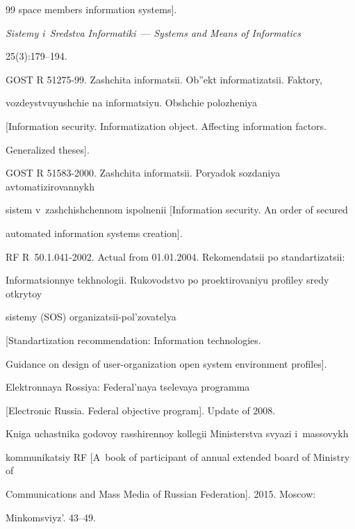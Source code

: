 {{\begin{thebibliography}{99}
space members information systems]. 

\textit{Sistemy i~Sredstva Informatiki}~--- \textit{Systems and Means of Informatics} 

25(3):179--194.




GOST R 51275-99. Zashchita informatsii. Ob''ekt informatizatsii. Faktory, 

vozdeystvuyushchie na informatsiyu. Obshchie polozheniya

[Information security. Informatization object. Affecting information factors. 

Generalized theses].


GOST R 51583-2000. Zashchita informatsii. Poryadok sozdaniya avtomatizirovannykh 

sistem v~zashchishchennom ispolnenii [Information security. An order of secured 

automated information systems creation].




RF R~50.1.041-2002. Actual from 01.01.2004. Rekomendatsii po standartizatsii: 

Informatsionnye tekhnologii. Rukovodstvo po proektirovaniyu profiley sredy otkrytoy 

sistemy (SOS) organizatsii-pol'zovatelya 

[Standartization recommendation: Information technologies. 

Guidance on design of user-organization open system environment profiles].


Elektronnaya Rossiya: Federal'naya tselevaya programma

[Electronic Russia. Federal objective program]. Update of 2008.


Kniga uchastnika godovoy rasshirennoy kollegii Ministerstva svyazi i~massovykh 

kommunikatsiy RF [A~book of participant of annual extended board of Ministry of 

Communications and Mass Media of Russian Federation]. 2015. Moscow:

Minkomsviyz'. 43--49.





\end{thebibliography}

} }





